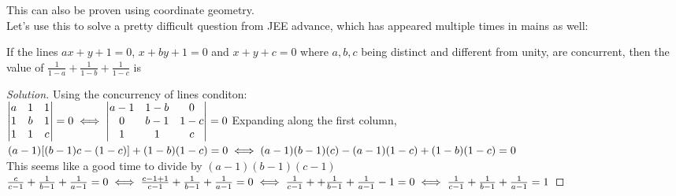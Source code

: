 This can also be proven using coordinate geometry.\\
Let's use this to solve a pretty difficult question from JEE advance, which has appeared multiple times in mains as well:\\
\begin{example}
     If the lines $ax + y + 1 = 0$, $x + by + 1 = 0$ and $x + y + c = 0$
where $a, b, c$ being distinct and different from unity, are
concurrent, then the value of $\frac{1}{1-a}+\frac{1}{1-b}+\frac{1}{1-c}$ is
\end{example}
\begin{proof}
    [Solution]
    Using the concurrency of lines conditon:\\
    $\begin{vmatrix}
        a & 1 & 1\\
        1 & b & 1\\
        1 & 1 & c\\
    \end{vmatrix} = 0\\
    \iff \begin{vmatrix}
        a-1 & 1-b & 0\\
        0 & b-1 & 1-c\\
        1 & 1 & c\\
    \end{vmatrix}=0$
Expanding along the first column,\\
$(a-1)[(b-1)c-(1-c)]+(1-b)(1-c)=0\\
\iff (a-1)(b-1)(c)-(a-1)(1-c)+(1-b)(1-c)=0$\\
This seems like a good time to divide by $(a-1)(b-1)(c-1)$\\
$\frac{c}{c-1}+\frac{1}{b-1}+\frac{1}{a-1}=0\\
\iff \frac{c-1+1}{c-1}+\frac{1}{b-1}+\frac{1}{a-1}=0\\
\iff \frac{1}{c-1}++\frac{1}{b-1}+\frac{1}{a-1}-1=0\\
\iff \frac{1}{c-1}+\frac{1}{b-1}+\frac{1}{a-1}=1\\$
\end{proof}
